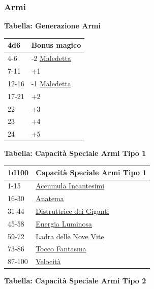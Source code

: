 \begin{multicols}{2}
{\subsubsection{Armi}

\textbf{Tabella: Generazione Armi}\hypertarget{armimagiche}{}\label{armimagiche}

\medskip

{\small\begin{tabularx}{0.45\textwidth}{lX}
		\toprule
\textbf{4d6} & \textbf{Bonus magico}\\
\toprule
4-6 & -2 \hyperlink{Arma maledetta}{Maledetta}\\
7-11 &+1\\
12-16 & -1 \hyperlink{Arma maledetta}{Maledetta}\\
17-21 & +2\\
22 & +3\\
23 & +4\\
24 &+5\\
\end{tabularx}}

\textbf{Tabella: Capacità Speciale Armi Tipo 1}\hypertarget{Capacità Speciale Armi Tipo 1}{}

\medskip

{\small \begin{tabular}{ll}
		\toprule
\textbf{1d100} & \textbf{Capacità Speciale Armi Tipo 1}\\
\toprule
1-15 &\hyperlink{AccumulaIncantesimi}{Accumula Incantesimi}\\
16-30 &\hyperlink{armaAnatema}{Anatema}\\
31-44 & \hyperlink{DistruttricedeiGiganti}{Distruttrice dei Giganti}\\
45-58 & \hyperlink{EnergiaLuminosa}{Energia Luminosa}\\
59-72 & \hyperlink{LadradelleNoveVite}{Ladra delle Nove Vite}\\
73-86 & \hyperlink{ToccoFantasma}{Tocco Fantasma}\\
87-100 & \hyperlink{armaVelocità}{Velocità}\\
\end{tabular}
}
\medskip


\textbf{Tabella: Capacità Speciale Armi Tipo 2}\hypertarget{Capacità Speciale Armi Tipo 2}{}

}
\end{multicols}
